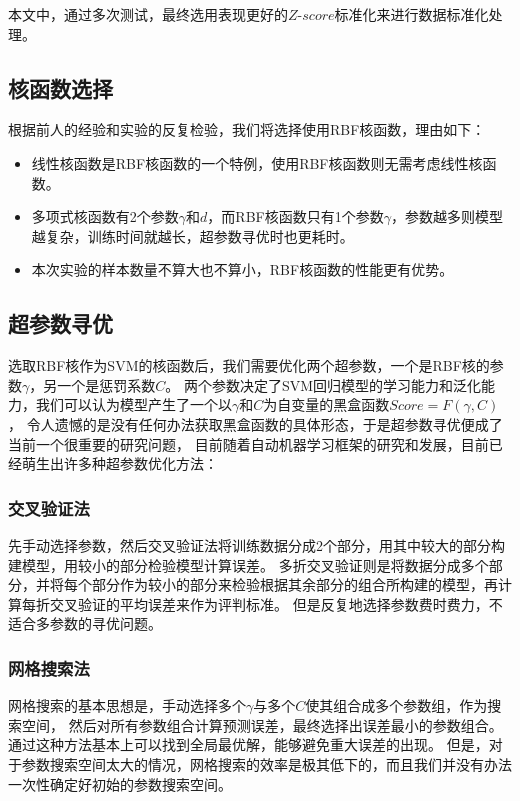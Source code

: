 本文中，通过多次测试，最终选用表现更好的$Z\text{-}score$标准化来进行数据标准化处理。

\subsection{核函数选择}

根据前人的经验和实验的反复检验，我们将选择使用RBF核函数，理由如下：
\begin{itemize}
    \item 线性核函数是RBF核函数的一个特例，使用RBF核函数则无需考虑线性核函数。
    \item 多项式核函数有2个参数$\gamma$和$d$，而RBF核函数只有1个参数$\gamma$，参数越多则模型越复杂，训练时间就越长，超参数寻优时也更耗时。
    \item 本次实验的样本数量不算大也不算小，RBF核函数的性能更有优势。
\end{itemize}

\subsection{超参数寻优}

选取RBF核作为SVM的核函数后，我们需要优化两个超参数，一个是RBF核的参数$\gamma$，另一个是惩罚系数$C$。
两个参数决定了SVM回归模型的学习能力和泛化能力，我们可以认为模型产生了一个以$\gamma$和$C$为自变量的黑盒函数$Score=F(\gamma,C)$，
令人遗憾的是没有任何办法获取黑盒函数的具体形态，于是超参数寻优便成了当前一个很重要的研究问题，
目前随着自动机器学习框架的研究和发展，目前已经萌生出许多种超参数优化方法：

\subsubsection{交叉验证法}

先手动选择参数，然后交叉验证法将训练数据分成2个部分，用其中较大的部分构建模型，用较小的部分检验模型计算误差。
多折交叉验证则是将数据分成多个部分，并将每个部分作为较小的部分来检验根据其余部分的组合所构建的模型，再计算每折交叉验证的平均误差来作为评判标准。
但是反复地选择参数费时费力，不适合多参数的寻优问题。

\subsubsection{网格搜索法}

网格搜索的基本思想是，手动选择多个$\gamma$与多个$C$使其组合成多个参数组，作为搜索空间，
然后对所有参数组合计算预测误差，最终选择出误差最小的参数组合。
通过这种方法基本上可以找到全局最优解，能够避免重大误差的出现。
但是，对于参数搜索空间太大的情况，网格搜索的效率是极其低下的，而且我们并没有办法一次性确定好初始的参数搜索空间。


